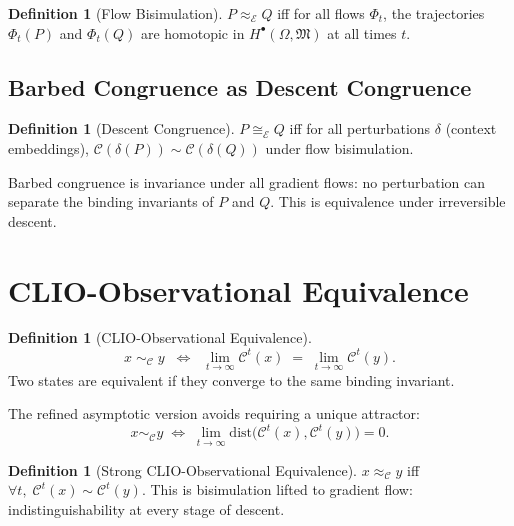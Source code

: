 \documentclass[11pt, letterpaper]{article}
\theoremstyle{plain}
\theoremstyle{definition}
\newtheorem{definition}[theorem]{Definition}
\theoremstyle{remark}
\newcommand{\CC}{\mathcal{C}}
\newcommand{\MM}{\mathfrak{M}}
\newcommand{\EE}{\mathcal{E}}
\begin{document}
\begin{definition}[Flow Bisimulation]
$P \approx_\EE Q$ iff for all flows $\Phi_t$, the trajectories $\Phi_t(P)$ and
$\Phi_t(Q)$ are homotopic in $H^\bullet(\Omega, \MM)$ at all times $t$.
\end{definition}

\subsection{Barbed Congruence as Descent Congruence}

\begin{definition}[Descent Congruence]
$P \cong_\EE Q$ iff for all perturbations $\delta$ (context embeddings),
$\CC(\delta(P)) \sim \CC(\delta(Q))$ under flow bisimulation.
\end{definition}

Barbed congruence is invariance under all gradient flows: no perturbation can separate
the binding invariants of $P$ and $Q$. This is equivalence under irreversible descent.

\section{CLIO-Observational Equivalence}

\begin{definition}[CLIO-Observational Equivalence]
\[
  x \;\sim_\CC\; y
  \;\;\Longleftrightarrow\;\;
  \lim_{t \to \infty}\CC^t(x) \;=\; \lim_{t \to \infty}\CC^t(y).
\]
Two states are equivalent if they converge to the same binding invariant.
\end{definition}

The refined asymptotic version avoids requiring a unique attractor:
\[
  x \sim_\CC y
  \;\Longleftrightarrow\;
  \lim_{t\to\infty} \mathrm{dist}\bigl(\CC^t(x), \CC^t(y)\bigr) = 0.
\]

\begin{definition}[Strong CLIO-Observational Equivalence]
$x \approx_\CC y$ iff $\forall t,\; \CC^t(x) \sim \CC^t(y)$. This is bisimulation
lifted to gradient flow: indistinguishability at every stage of descent.
\end{definition}
\end{document}
